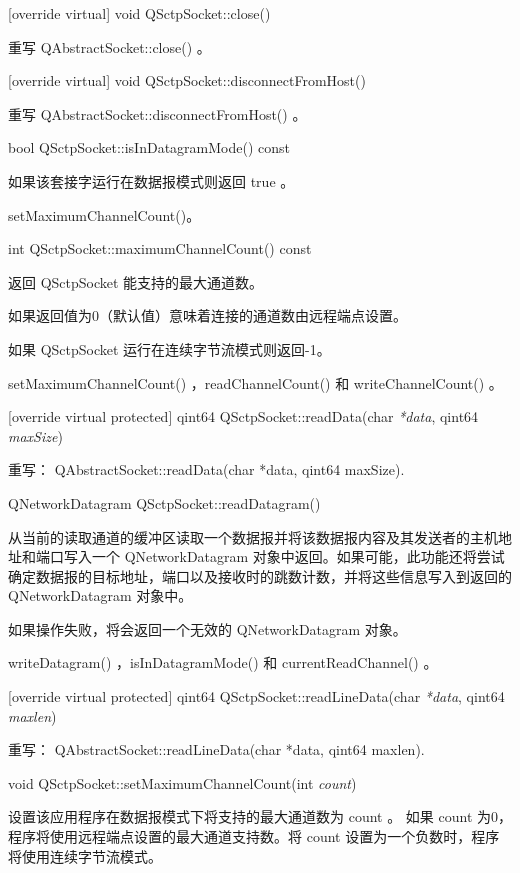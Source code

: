 [override virtual] void QSctpSocket::close()

重写 QAbstractSocket::close() 。

[override virtual] void QSctpSocket::disconnectFromHost()

重写 QAbstractSocket::disconnectFromHost() 。

bool QSctpSocket::isInDatagramMode() const

如果该套接字运行在数据报模式则返回 true 。

\begin{seeAlso}
setMaximumChannelCount()。
\end{seeAlso}

int QSctpSocket::maximumChannelCount() const

返回 QSctpSocket 能支持的最大通道数。

如果返回值为0（默认值）意味着连接的通道数由远程端点设置。

如果 QSctpSocket 运行在连续字节流模式则返回-1。

\begin{seeAlso}
setMaximumChannelCount() ，readChannelCount() 和 writeChannelCount() 。
\end{seeAlso}

[override virtual protected] qint64 QSctpSocket::readData(char \emph{*data}, qint64 \emph{maxSize})

重写： QAbstractSocket::readData(char *data, qint64 maxSize).

QNetworkDatagram QSctpSocket::readDatagram()

从当前的读取通道的缓冲区读取一个数据报并将该数据报内容及其发送者的主机地址和端口写入一个 QNetworkDatagram 对象中返回。如果可能，此功能还将尝试确定数据报的目标地址，端口以及接收时的跳数计数，并将这些信息写入到返回的 QNetworkDatagram 对象中。

如果操作失败，将会返回一个无效的 QNetworkDatagram 对象。

\begin{seeAlso}
writeDatagram() ，isInDatagramMode() 和 currentReadChannel() 。
\end{seeAlso}

[override virtual protected] qint64 QSctpSocket::readLineData(char \emph{*data}, qint64 \emph{maxlen})

重写： QAbstractSocket::readLineData(char *data, qint64 maxlen).

void QSctpSocket::setMaximumChannelCount(int \emph{count})

设置该应用程序在数据报模式下将支持的最大通道数为 count 。 如果 count 为0，程序将使用远程端点设置的最大通道支持数。将 count 设置为一个负数时，程序将使用连续字节流模式。

